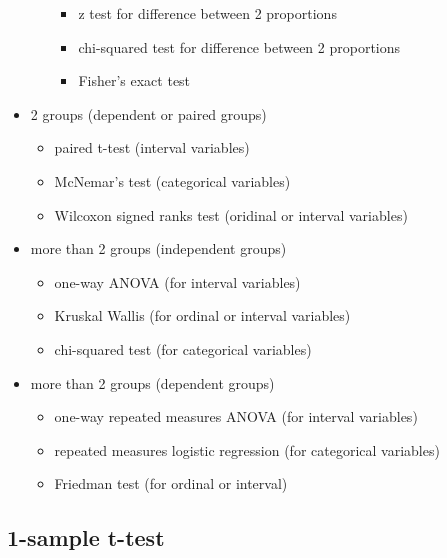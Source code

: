 \documentclass[]{book}
\providecommand{\tightlist}{%
  \setlength{\itemsep}{0pt}\setlength{\parskip}{0pt}}
\begin{document}
\begin{itemize}
\begin{itemize}
    \begin{itemize}
    \tightlist
    \item
      z test for difference between 2 proportions
    \item
      chi-squared test for difference between 2 proportions
    \item
      Fisher's exact test
    \end{itemize}
  \end{itemize}
\item
  2 groups (dependent or paired groups)

  \begin{itemize}
  \tightlist
  \item
    paired t-test (interval variables)
  \item
    McNemar's test (categorical variables)
  \item
    Wilcoxon signed ranks test (oridinal or interval variables)
  \end{itemize}
\item
  more than 2 groups (independent groups)

  \begin{itemize}
  \tightlist
  \item
    one-way ANOVA (for interval variables)
  \item
    Kruskal Wallis (for ordinal or interval variables)
  \item
    chi-squared test (for categorical variables)
  \end{itemize}
\item
  more than 2 groups (dependent groups)

  \begin{itemize}
  \tightlist
  \item
    one-way repeated measures ANOVA (for interval variables)
  \item
    repeated measures logistic regression (for categorical variables)
  \item
    Friedman test (for ordinal or interval)
  \end{itemize}
\end{itemize}

\hypertarget{sample-t-test}{%
\subsection{1-sample t-test}\label{sample-t-test}}
\end{document}
